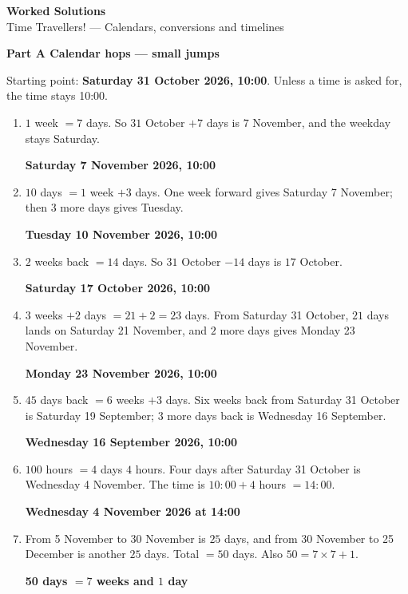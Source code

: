 \documentclass[11pt,a4paper]{article}
\newcommand{\banner}[1]{{\color{ttdark}\large\bfseries #1}\par\vspace{-4pt}{\color{ttdark}\rule{\linewidth}{1pt}}\par\vspace{2pt}}
\newcommand{\ans}[1]{\textcolor{ttaccent}{\bfseries #1}}
\begin{document}
\begin{center}
{\LARGE\bfseries Worked Solutions}\\[2pt]
{\large Time Travellers! --- Calendars, conversions and timelines}
\end{center}

\banner{Part A \quad Calendar hops --- small jumps}

Starting point: \textbf{Saturday 31 October 2026, 10:00}. Unless a time is asked for, the time stays 10:00.

\begin{enumerate}[label=\textbf{\arabic*.}, leftmargin=*, itemsep=6pt]
\item $1$ week $=7$ days. So $31$ October $+7$ days is $7$ November, and the weekday stays Saturday.

\ans{Saturday 7 November 2026, 10:00}

\item $10$ days $=1$ week $+3$ days. One week forward gives Saturday 7 November; then $3$ more days gives Tuesday.

\ans{Tuesday 10 November 2026, 10:00}

\item $2$ weeks back $=14$ days. So $31$ October $-14$ days is $17$ October.

\ans{Saturday 17 October 2026, 10:00}

\item $3$ weeks $+2$ days $=21+2=23$ days. From Saturday 31 October, $21$ days lands on Saturday 21 November, and $2$ more days gives Monday 23 November.

\ans{Monday 23 November 2026, 10:00}

\item $45$ days back $=6$ weeks $+3$ days. Six weeks back from Saturday 31 October is Saturday 19 September; $3$ more days back is Wednesday 16 September.

\ans{Wednesday 16 September 2026, 10:00}

\item $100$ hours $=4$ days $4$ hours. Four days after Saturday 31 October is Wednesday 4 November. The time is $10{:}00+4$ hours $=14{:}00$.

\ans{Wednesday 4 November 2026 at 14:00}

\item From 5 November to 30 November is $25$ days, and from 30 November to 25 December is another $25$ days. Total $=50$ days. Also
$50=7\times7+1$.

\ans{50 days $=7$ weeks and $1$ day}


\end{enumerate}
\end{document}
